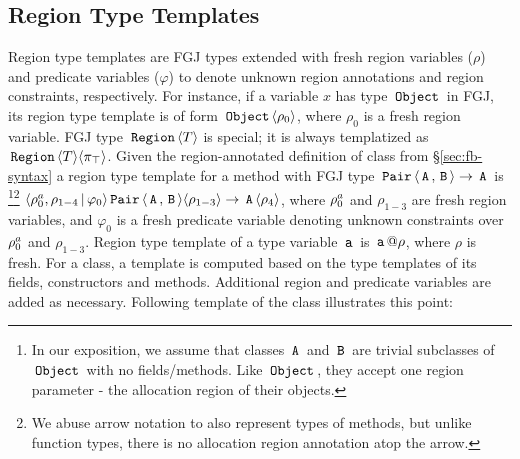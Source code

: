 \subsection{Region Type Templates}
\label{sec:fb-templatization}

Region type templates are FGJ types extended with fresh region
variables ($\rho$) and predicate variables ($\varphi$) to denote
unknown region annotations and region constraints, respectively. For
instance, if a variable $x$ has type $\,{\tt Object}\,$ in FGJ, its region type
template is of form $\,{\tt Object}\,\langle \rho_0 \rangle$, where $\rho_0$ is a fresh
region variable. FGJ type $\,{\tt Region}\,\langle T \rangle$ is special; it is always
templatized as $\,{\tt Region}\,{\langle T \rangle}\langle \pi_{\top} \rangle$. Given the
region-annotated definition of  class from
\S\ref{sec:fb-syntax} a region type template for a method with FGJ
type $\,{\tt Pair}\,\langle \,{\tt A}\,,\,{\tt B}\, \rangle \rightarrow \,{\tt A}\,$ is \footnote{In
our exposition, we assume that classes $\,{\tt A}\,$ and $\,{\tt B}\,$ are trivial
subclasses of $\,{\tt Object}\,$ with no fields/methods. Like $\,{\tt Object}\,$, they
accept one region parameter - the allocation region of their
objects.}\footnote{We abuse arrow notation to also represent types of
methods, but unlike function types, there is no allocation region
annotation atop the arrow.}
$\langle \rho^a_0,\rho_{1-4} \,|\, \varphi_0 \rangle
\,{\tt Pair}\,\langle \,{\tt A}\,,\,{\tt B}\, \rangle \langle \rho_{1-3} \rangle \rightarrow
\,{\tt A}\,\langle \rho_4 \rangle$, where $\rho^a_0$ and $\rho_{1-3}$ are fresh
region variables, and $\varphi_0$ is a fresh predicate variable
denoting unknown constraints over $\rho^a_0$ and $\rho_{1-3}$.
Region type template of a type variable $\,{\tt a}\,$ is $\,{\tt a}\,@\rho$, where
$\rho$ is fresh. For a class, a template is computed based on the 
type templates of its fields, constructors and methods. Additional
region and predicate variables are added as necessary. Following template 
of the  class illustrates this point:
